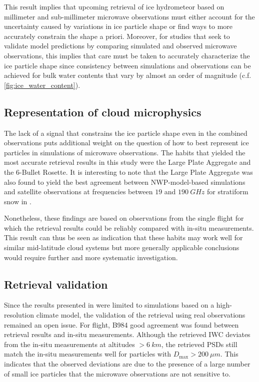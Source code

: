 \documentclass[journal abbreviation, manuscript]{copernicus}
\begin{document}
This result implies that upcoming retrieval of ice hydrometeor based on
millimeter and sub-millimeter microwave observations must either account for the
uncertainty caused by variations in ice particle shape or find ways to more
accurately constrain the shape a priori. Moreover, for studies that seek to
validate model predictions by comparing simulated and observed microwave
observations, this implies that care must be taken to accurately characterize
the ice particle shape since consistency between simulations and observations
can be achieved for bulk water contents that vary by almost an order of
magnitude (c.f. \ref{fig:ice_water_content}).

\subsection{Representation of cloud microphysics}

The lack of a signal that constrains the ice particle shape even in the combined
observations puts additional weight on the question of how to best represent ice
particles in simulations of microwave observations. The habits that yielded the
most accurate retrieval results in this study were the Large Plate Aggregate and
the 6-Bullet Rosette. It is interesting to note that the Large Plate Aggregate
was also found to yield the best agreement between NWP-model-based simulations
and satellite observations at frequencies between $19$ and $190\ \unit{GHz}$ for
stratiform snow in \citet{geer21}.

Nonetheless, these findings are based on observations from the single flight for
which the retrieval results could be reliably compared with in-situ
measurements. This result can thus be seen as indication that these habits may
work well for similar mid-latitude cloud systems but more generally applicable
conclusions would require further and more systematic investigation.

\subsection{Retrieval validation}

Since the results presented in \citet{pfreundschuh20} were limited to
simulations based on a high-resolution climate model, the validation of the
retrieval using real observations remained an open issue. For flight, B984 good
agreement was found between retrieval results and in-situ measurements. Although
the retrieved IWC deviates from the in-situ measurements at altitudes $>
6\ \unit{km}$, the retrieved PSDs still match the in-situ measurements well for
particles with $D_\text{max} > 200\ \unit{\mu m}$. This indicates that the
observed deviations are due to the presence of a large number of small ice
particles that the microwave observations are not sensitive to.
\end{document}

